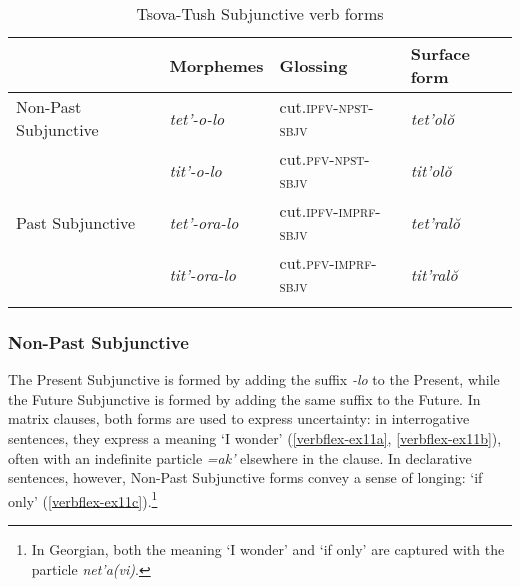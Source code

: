 \begin{table}
	\begin{tabular}{llll}
		
		\lsptoprule
		& Morphemes & Glossing & Surface form \\\midrule
		
		
		Non-Past Subjunctive & \textit{tet'-o-lo} & cut.\textsc{ipfv-npst-sbjv} & \textit{tet'ol\u{o}} \\
		& \textit{tit'-o-lo} & cut.\textsc{pfv-npst-sbjv} & \textit{tit'ol\u{o}} \\
		
		Past Subjunctive & \textit{tet'-ora-lo} & cut.\textsc{ipfv-imprf-sbjv} & \textit{tet'ral\u{o}} \\
		& \textit{tit'-ora-lo} & cut.\textsc{pfv-imprf-sbjv} & \textit{tit'ral\u{o}} \\
		
		\lspbottomrule
		
	\end{tabular}
	\caption{Tsova-Tush Subjunctive verb forms}
	\label{table-subjverbflex}
\end{table}


\subsubsection{Non-Past Subjunctive}

The Present Subjunctive is formed by adding the suffix \textit{-lo} to the Present, while the Future Subjunctive is formed by adding the same suffix to the Future. In matrix clauses, both forms are used to express uncertainty: in interrogative sentences, they express a meaning  `I wonder' (\ref{verbflex-ex11a}, \ref{verbflex-ex11b}), often with an indefinite particle \textit{=ak'} elsewhere in the clause. In declarative sentences, however, Non-Past Subjunctive forms convey a sense of longing: `if only' (\ref{verbflex-ex11c}).\footnote{In Georgian, both the meaning `I wonder' and `if only' are captured with the particle \textit{net'a(vi)}.}

